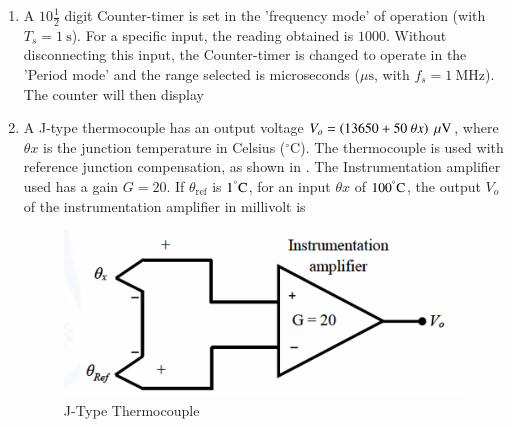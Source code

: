 \documentclass[journal,12pt,onecolumn]{IEEEtran}
\theoremstyle{remark}
\begin{document}
\begin{enumerate}
\item A $10\frac{1}{2}$ digit Counter-timer is set in the 'frequency mode' of operation (with $T_s = 1\ \text{s}$). For a specific input, the reading obtained is $1000$. Without disconnecting this input, the Counter-timer is changed to operate in the 'Period mode' and the range selected is microseconds ($\mu \text{s}$, with $f_s = 1\ \text{MHz}$).
The counter will then display \par \hfill{}
\begin{enumerate}[label=(\Alph*)]
\end{enumerate}

\item A J-type thermocouple has an output voltage $V_o = \brak{13650 + 50\ \theta x}\ \mu\text{V}$, where $\theta x$ is the junction temperature in Celsius ($^\circ \text{C}$). The thermocouple is used with
reference junction compensation, as shown in . The
Instrumentation amplifier used has a gain $G = 20$. If $\theta_{\text{ref}}$ is $1^\degree \text{C}$, for an input
$\theta x$ of $100^\degree \text{C}$, the output $V_o$ of the instrumentation amplifier in millivolt is 
\begin{figure}[H]
    \centering
    \includegraphics[width=0.5\linewidth]{Figs/Q-33.png}
    \caption{J-Type Thermocouple}
    \label{33}
\end{figure}
\par \hfill{}
\begin{enumerate}[label=(\Alph*)]
\end{enumerate}


\end{enumerate}
\end{document}

